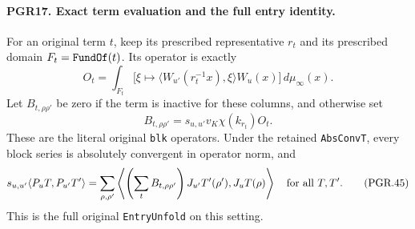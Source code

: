 \documentclass[11pt,a4paper]{article}
\numberwithin{equation}{section}
\theoremstyle{remark}\newtheorem{remark}[theorem]{Remark}
\begin{document}
\paragraph{PGR17. Exact term evaluation and the full entry identity.}
\label{claim:PGR17}
For an original term \(t\), keep its prescribed representative
\(r_t\) and its prescribed domain \(F_t=\texttt{Fund\allowbreak Of}(t)\).
Its operator is exactly
\[
 O_t=\int_{F_t}
      \bigl[\xi\longmapsto
       \langle W_{u'}(r_t^{-1}x),\xi\rangle W_u(x)\bigr]
                                         \,d\mu_\infty(x).
\tag{PGR.43}
\]
Let \(B_{t,\rho\rho'}\) be zero if the term is inactive for
these columns, and otherwise set
\[
 B_{t,\rho\rho'}=s_{u,u'}v_K\chi(k_{r_t})O_t.
\tag{PGR.44}
\]
These are the literal original \texttt{blk} operators.  Under
the retained \texttt{Abs\allowbreak Conv\allowbreak T}, every block series is absolutely
convergent in operator norm, and
\[
 s_{u,u'}\langle P_uT,P_{u'}T'\rangle
   =\sum_{\rho,\rho'}
      \left\langle
       \left(\sum_t B_{t,\rho\rho'}\right)J_{u'}T'(\rho'),
                         J_uT(\rho)\right\rangle
                   \quad\hbox{for all }T,T'.
\tag{PGR.45}
\]
This is the full original \texttt{Entry\allowbreak Unfold} on this setting.
\end{document}
